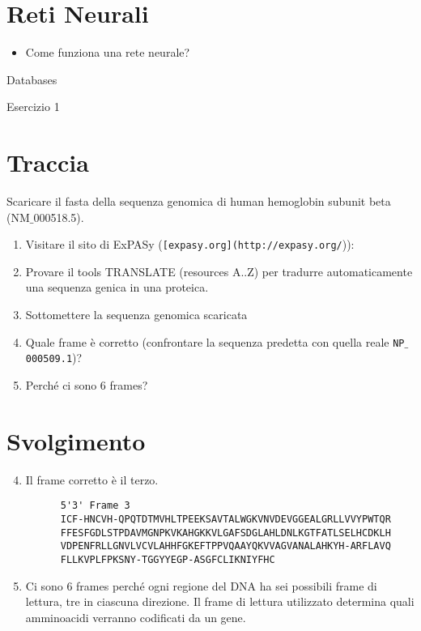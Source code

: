 \documentclass{article}
\begin{document}
\section{Reti Neurali}
\begin{itemize}
   \item Come funziona una rete neurale?
      \subitem{-} 
\end{itemize}
\begin{center}
   \Huge
   Databases
\end{center}
\begin{center}
   \huge
   Esercizio 1
\end{center}
\section*{Traccia}
Scaricare il fasta della sequenza genomica di human hemoglobin subunit beta (NM$\_$000518.5).
\begin{enumerate}
   \item Visitare il sito di ExPASy (\texttt{[expasy.org](http://expasy.org/})):
   \item Provare il tools TRANSLATE (resources A..Z) per tradurre automaticamente una sequenza genica in una proteica.
   \item Sottomettere la sequenza genomica scaricata
   \item Quale frame è corretto (confrontare la sequenza predetta con quella reale \texttt{NP$\_$000509.1})?
   \item Perché ci sono 6 frames?
\end{enumerate}
\section*{Svolgimento}
\begin{enumerate}
   \setcounter{enumi}{3}
   \item Il frame corretto è il terzo.\\
   \begin{verbatim}
      5'3' Frame 3
      ICF-HNCVH-QPQTDTMVHLTPEEKSAVTALWGKVNVDEVGGEALGRLLVVYPWTQR
      FFESFGDLSTPDAVMGNPKVKAHGKKVLGAFSDGLAHLDNLKGTFATLSELHCDKLH
      VDPENFRLLGNVLVCVLAHHFGKEFTPPVQAAYQKVVAGVANALAHKYH-ARFLAVQ
      FLLKVPLFPKSNY-TGGYYEGP-ASGFCLIKNIYFHC
   \end{verbatim}
   \item Ci sono 6 frames perché ogni regione del DNA ha sei possibili frame di lettura, tre in ciascuna direzione. Il frame di lettura utilizzato determina quali amminoacidi verranno codificati da un gene.
\end{enumerate}
\end{document}
